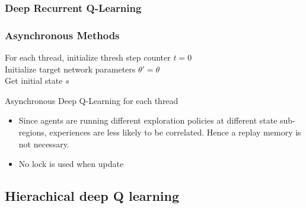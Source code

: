\begin{refsection}
\subsubsection{Deep Recurrent Q-Learning }

\cite{hausknecht2015deep}


\subsubsection{Asynchronous Methods}
\cite{mnih2016asynchronous}


\begin{algorithm}
	For each thread, initialize thresh step counter $t = 0$ \\
	Initialize target network parameters $\theta' = \theta$ \\
	Get initial state $s$
	
	\caption{Asynchronous Deep Q-Learning for each thread}
\end{algorithm}


\begin{remark}[interpretation]
\begin{itemize}
	\item Since agents are running different exploration policies at different state sub-regions, experiences are less likely to be correlated. Hence a replay memory is not necessary.
	\item No lock is used when update  
\end{itemize}
	
\end{remark}


\subsection{Hierachical deep Q learning}



\end{refsection}
